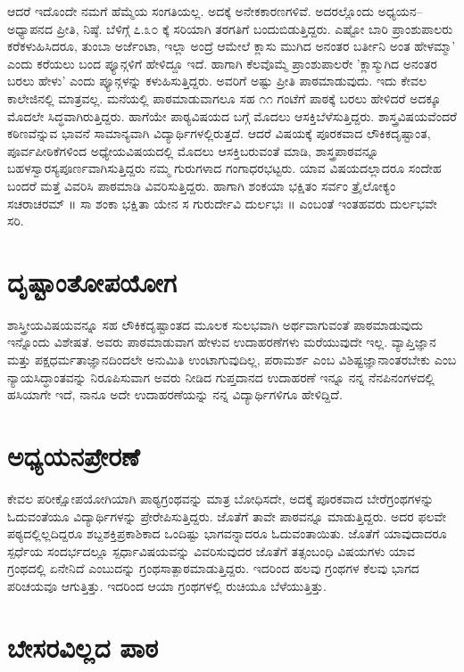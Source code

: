 ಆದರೆ ಇದೊಂದೇ ನಮಗೆ ಹೆಮ್ಮೆಯ ಸಂಗತಿಯಲ್ಲ. ಅದಕ್ಕೆ ಅನೇಕಕಾರಣಗಳಿವೆ. ಅದರಲ್ಲೊಂದು ಅಧ್ಯಯನ–ಅಧ್ಯಾಪನದ ಪ್ರೀತಿ, ನಿಷ್ಠೆ. ಬೆಳಿಗ್ಗೆ ೭.೩೦ ಕ್ಕೆ ಸರಿಯಾಗಿ ತರಗತಿಗೆ ಬಂದುಬಿಡುತ್ತಿದ್ದರು. ಎಷ್ಟೋ ಬಾರಿ ಪ್ರಾಂಶುಪಾಲರು ಕರೆಕಳುಹಿಸಿದರೂ, ತುಂಬಾ ಅರ್ಜೆಂಟಾ, ಇಲ್ಲಾ ಅಂದ್ರೆ ಆಮೇಲೆ ಕ್ಲಾಸು ಮುಗಿದ ಅನಂತರ ಬರ್ತೀನಿ ಅಂತ ಹೇಳಮ್ಮಾ’ ಎಂದು ಕರೆಯಲು ಬಂದ ಪ್ಯೂನ್ಗಳಿಗೆ ಹೇಳಿದ್ದೂ ಇದೆ. ಹಾಗಾಗಿ ಕೆಲವೊಮ್ಮೆ ಪ್ರಾಂಶುಪಾಲರೇ ’ಕ್ಲಾಸ್ಮುಗಿದ ಅನಂತರ ಬರಲು ಹೇಳು’ ಎಂದು ಪ್ಯೂನ್ಗಳನ್ನು ಕಳುಹಿಸುತ್ತಿದ್ದರು. ಅವರಿಗೆ ಅಷ್ಟು ಪ್ರೀತಿ ಪಾಠಮಾಡುವುದು. ಇದು ಕೇವಲ ಕಾಲೇಜಿನಲ್ಲಿ ಮಾತ್ರವಲ್ಲ. ಮನೆಯಲ್ಲಿ ಪಾಠಮಾಡುವಾಗಲೂ ಸಹ ೧೧ ಗಂಟೆಗೆ ಪಾಠಕ್ಕೆ ಬರಲು ಹೇಳಿದರೆ ಅದಕ್ಕೂ ಮೊದಲೇ ಸಿದ್ಧವಾಗಿರುತ್ತಿದ್ದರು.
ಹಾಗೆಯೇ ಪಾಠ್ಯವಿಷಯದ ಬಗ್ಗೆ ಮೊದಲು ಆಸಕ್ತಿಬೆಳೆಸುತ್ತಿದ್ದರು. ಶಾಸ್ತ್ರವಿಷಯವೆಂದರೆ ಕಠಿಣವೆನ್ನುವ ಭಾವನೆ ಸಾಮಾನ್ಯವಾಗಿ ವಿದ್ಯಾರ್ಥಿಗಳಲ್ಲಿರುತ್ತದೆ. ಆದರೆ ವಿಷಯಕ್ಕೆ ಪೂರಕವಾದ ಲೌಕಿಕದೃಷ್ಟಾಂತ, ಪೂರ್ವಪೀಠಿಕೆಗಳಿಂದ ಅಧ್ಯೇಯವಿಷಯದಲ್ಲಿ ಮೊದಲು ಆಸಕ್ತಿಬರುವಂತೆ ಮಾಡಿ, ಶಾಸ್ತ್ರಪಾಠವನ್ನೂ ಬಹಳಸ್ವಾರಸ್ಯಪೂರ್ಣವಾಗಿಸುತ್ತಿದ್ದರು ನಮ್ಮ ಗುರುಗಳಾದ ಗಂಗಾಧರಭಟ್ಟರು. ಯಾವ ವಿಷಯದಲ್ಲಾದರೂ ಸಂದೇಹ ಬಂದರೆ ಮತ್ತೆ ವಿವರಿಸಿ ಪಾಠಮಾಡಿ ವಿವರಿಸುತ್ತಿದ್ದರು. ಹಾಗಾಗಿ ಶಂಕಯಾ ಭಕ್ಷಿತಂ ಸರ್ವಂ ತ್ರೈಲೋಕ್ಯಂ ಸಚರಾಚರಮ್ ॥ ಸಾ ಶಂಕಾ ಭಕ್ಷಿತಾ ಯೇನ ಸ ಗುರುರ್ದೇವಿ ದುರ್ಲಭಃ ॥ ಎಂಬಂತೆ ಇಂತಹವರು ದುರ್ಲಭವೇ ಸರಿ.

\section*{ದೃಷ್ಟಾಂತೋಪಯೋಗ}

ಶಾಸ್ತ್ರೀಯವಿಷಯವನ್ನೂ ಸಹ ಲೌಕಿಕದೃಷ್ಟಾಂತದ ಮೂಲಕ ಸುಲಭವಾಗಿ ಅರ್ಥವಾಗುವಂತೆ ಪಾಠಮಾಡುವುದು ಇನ್ನೊಂದು ವಿಶೇಷತೆ. ಅವರು ಪಾಠಮಾಡುವಾಗ ಹೇಳುವ ಉದಾಹರಣೆಗಳು ಮರೆಯುವುದೇ ಇಲ್ಲ. ವ್ಯಾಪ್ತಿಜ್ಞಾನ ಮತ್ತು ಪಕ್ಷಧರ್ಮತಾಜ್ಞಾನದಿಂದಲೇ ಅನುಮಿತಿ ಉಂಟಾಗುವುದಿಲ್ಲ, ಪರಾಮರ್ಶ ಎಂಬ ವಿಶಿಷ್ಟಜ್ಞಾನಾಂತರಬೇಕು ಎಂಬ ನ್ಯಾಯಸಿದ್ಧಾಂತವನ್ನು ನಿರೂಪಿಸುವಾಗ ಅವರು ನೀಡಿದ ಗುಪ್ತದಾನದ ಉದಾಹರಣೆ ಇನ್ನೂ ನನ್ನ ನೆನಪಿನಂಗಳದಲ್ಲಿ ಹಸಿಯಾಗೇ ಇದೆ, ನಾನೂ ಅದೇ ಉದಾಹರಣೆಯನ್ನು ನನ್ನ ವಿದ್ಯಾರ್ಥಿಗಳಿಗೂ ಹೇಳಿದ್ದಿದೆ.

\section*{ಅಧ್ಯಯನಪ್ರೇರಣೆ}

ಕೇವಲ ಪರೀಕ್ಷೋಪಯೋಗಿಯಾಗಿ ಪಾಠ್ಯಗ್ರಂಥವನ್ನು ಮಾತ್ರ ಬೋಧಿಸದೇ, ಅದಕ್ಕೆ ಪೂರಕವಾದ ಬೇರೆಗ್ರಂಥಗಳನ್ನು ಓದುವಂತೆಯೂ ವಿದ್ಯಾರ್ಥಿಗಳನ್ನು ಪ್ರೇರೇಪಿಸುತ್ತಿದ್ದರು. ಜೊತೆಗೆ ತಾವೇ ಪಾಠವನ್ನೂ ಮಾಡುತ್ತಿದ್ದರು. ಅದರ ಫಲವೇ ಪಠ್ಯದಲ್ಲಿಲ್ಲದಿದ್ದರೂ ಶಬ್ದಶಕ್ತಿಪ್ರಕಾಶಿಕಾದ ಒಂದಿಷ್ಟು ಭಾಗವನ್ನಾದರೂ ಓದುವಂತಾಯಿತು. ಜೊತೆಗೆ ಯಾವುದಾದರೂ ಸ್ಪರ್ಧೆಯ ಸಂದರ್ಭದಲ್ಲೂ ಸ್ಪರ್ಧಾವಿಷಯವನ್ನು ವಿವರಿಸುವುದರ ಜೊತೆಗೆ ತತ್ಸಂಬಂಧಿ ವಿಷಯಗಳು ಯಾವ ಗ್ರಂಥದಲ್ಲಿ ಏನೇನಿದೆ ಎಂಬುದನ್ನು ಗ್ರಂಥಸಾತ್ಪಾಠಮಾಡುತ್ತಿದ್ದರು. ಇದರಿಂದ ಹಲವು ಗ್ರಂಥಗಳ ಕೆಲವು ಭಾಗದ ಪರಿಚಯವೂ ಆಗುತ್ತಿತ್ತು. ಇದರಿಂದ ಆಯಾ ಗ್ರಂಥಗಳಲ್ಲಿ ರುಚಿಯೂ ಬೆಳೆಯುತ್ತಿತ್ತು.

\section*{ಬೇಸರವಿಲ್ಲದ ಪಾಠ}

